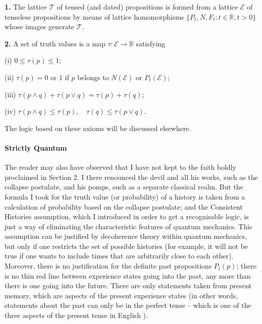 \documentclass[12pt,a4paper,reqno]{article}
\newcommand{\semilinespace}{\vspace{0.5\baselineskip}}
\renewcommand{\(}{\left(}
\renewcommand{\)}{\right)}
\newcommand{\R}{\mathbb{R}}
\newcommand{\E}{\mathcal{E}}
\newcommand{\T}{\mathcal{T}}
\newcommand{\<}{\langle}
\renewcommand{\>}{\rangle}
\theoremstyle{plain} %
\begin{document}
{\bf 1.} The lattice $\T$ of tensed (and dated) propositions is formed from a lattice $\E$ of tenseless propositions by means of lattice homomorphisms $\{P_t, N, F_t: t\in \R, t>0\}$ whose images generate $\T$.

{\bf 2.} A set of truth values is a map $\tau:\E\to\R$ satisfying

\semilinespace

\noindent (i) $0\le \tau(p) \le 1$;

\semilinespace

\noindent (ii) $\tau(p) = 0$ or $1$ if $p$ belongs to $N(\E)$ or $P_t(\E)$;

\semilinespace

\noindent (iii) $\tau(p\land q) + \tau(p\lor q) = \tau(p) + \tau(q)$;

\semilinespace

\noindent (iv) $\tau(p\land q) \le \tau(p), \hspace{1em} \tau(q) \le \tau(p\lor q)$.

\semilinespace
 
The logic based on these axioms will be discussed elsewhere.



\paragraph{Strictly Quantum}  The reader may also have observed that I have not kept to the faith boldly proclaimed in Section 2. I there renounced the devil and all his works, such as the collapse postulate, and his pomps, such as a separate classical realm. But the formula I took for the truth value (or probability) of a history is taken from a calculation of probability based on the collapse postulate; and the Consistent Histories assumption, which I introduced in order to   
get a recognisable logic, is just a way of eliminating the characteristic features of quantum mechanics. This assumption can be justified by decoherence theory within quantum mechanics, but only if one restricts the set of possible histories (for example, it will not be true if one wants to include times that are arbitrarily close to each other). Moreover, there is no justification for the definite past propositions $P_t(p)$; there is no thin red line between experience states going into the past, any more than there is one going into the future. There are only statements taken from present memory, which are aspects of the present experience states (in other words, statements about the past can only be in the perfect tense -- which is one of the three aspects of the present tense in English \cite{Joos}).
\end{document}
